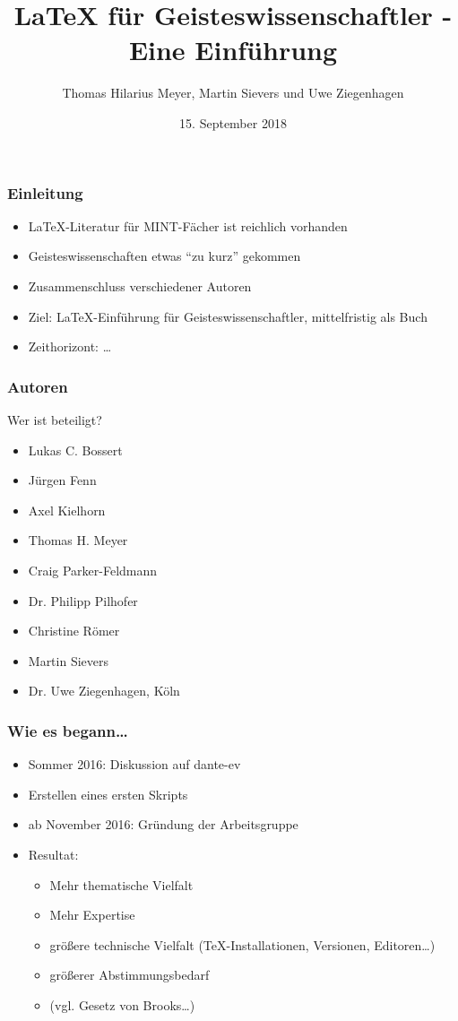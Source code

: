 \documentclass[12pt,ngerman]{beamer}
\title{\LaTeX{} für Geisteswissenschaftler - Eine Einführung}
\date{15. September 2018}
\author{Thomas Hilarius Meyer, Martin Sievers und Uwe Ziegenhagen}
\begin{document}
\begin{frame}
	 \maketitle
\end{frame}

\begin{frame}
\frametitle{Einleitung}

\begin{itemize}
\item \LaTeX-Literatur für MINT-Fächer ist reichlich vorhanden
\item Geisteswissenschaften etwas \enquote{zu kurz} gekommen
\item Zusammenschluss verschiedener Autoren
\item Ziel: \LaTeX-Einführung für Geisteswissenschaftler, mittelfristig als Buch
\item Zeithorizont: \ldots
\end{itemize}

\end{frame}

\begin{frame}
\frametitle{Autoren}

Wer ist beteiligt?

\begin{itemize}
\item Lukas C. Bossert
\item Jürgen Fenn
\item Axel Kielhorn
\item Thomas H. Meyer
\item Craig Parker-Feldmann
\item Dr. Philipp Pilhofer
\item Christine Römer
\item Martin Sievers
\item Dr. Uwe Ziegenhagen, Köln
\end{itemize}

\end{frame}

\begin{frame}
\frametitle{Wie es begann\ldots}


\begin{itemize}
\item Sommer 2016: Diskussion auf dante-ev
\item Erstellen eines ersten Skripts
\item ab November 2016: Gründung der Arbeitsgruppe
\item Resultat:
  \begin{itemize}
  \item Mehr thematische Vielfalt
  \item Mehr Expertise
  \item größere technische Vielfalt (\TeX-Installationen, Versionen, Editoren\ldots)
  \item größerer Abstimmungsbedarf
  \item (vgl. Gesetz von Brooks\ldots)
  \end{itemize}
\end{itemize}
\end{frame}
\end{document}
